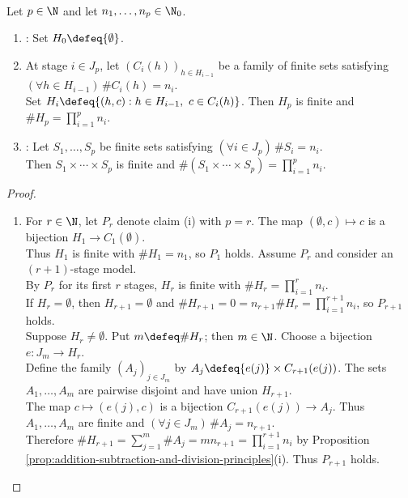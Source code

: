 \begin{theorem} \label{thm:multiplication-principle-finite-products} \\
Let $p\in\N$ and let $n_1,\ldots,n_p\in\N_0$.
\begin{enumerate}[label=(\roman*)]
\setlength{\itemsep}{0pt}
\item {}: Set $H_0\defeq\{\emptyset\}$.
\item At stage $i\in J_p$, let $(C_i(h))_{h\in H_{i-1}}$ be a family of finite sets satisfying $(\forall h\in H_{i-1})\,\#C_i(h)=n_i$.\\
Set $H_i\defeq\{(h,c):h\in H_{i-1},\ c\in C_i(h)\}$. Then $H_p$ is finite and $\#H_p=\prod\limits_{i=1}^{p}n_i$.
\item {}: Let $S_1,\ldots,S_p$ be finite sets satisfying $(\forall i\in J_p)\,\#S_i=n_i$.\\
Then $S_1\times\cdots\times S_p$ is finite and $\#(S_1\times\cdots\times S_p)=\prod\limits_{i=1}^{p}n_i$.
\end{enumerate}
\begin{proof}
\begin{enumerate}[label=(\roman*)]
\setlength{\itemsep}{0pt}
\item For $r\in\N$, let $P_r$ denote claim (i) with $p=r$. The map $(\emptyset,c)\mapsto c$ is a bijection $H_1\to C_1(\emptyset)$.\\
Thus $H_1$ is finite with $\#H_1=n_1$, so $P_1$ holds. Assume $P_r$ and consider an $(r+1)$-stage model.\\
By $P_r$ for its first $r$ stages, $H_r$ is finite with $\#H_r=\prod\limits_{i=1}^{r}n_i$.\\
If $H_r=\emptyset$, then $H_{r+1}=\emptyset$ and $\#H_{r+1}=0=n_{r+1}\#H_r=\prod\limits_{i=1}^{r+1}n_i$, so $P_{r+1}$ holds.\\
Suppose $H_r\neq\emptyset$. Put $m\defeq\#H_r$; then $m\in\N$. Choose a bijection $e:J_m\to H_r$.\\
Define the family $(A_j)_{j\in J_m}$ by $A_j\defeq\{e(j)\}\times C_{r+1}(e(j))$. The sets $A_1,\ldots,A_m$ are pairwise disjoint and have union $H_{r+1}$.\\
The map $c\mapsto(e(j),c)$ is a bijection $C_{r+1}(e(j))\to A_j$. Thus $A_1,\ldots,A_m$ are finite and $(\forall j\in J_m)\,\#A_j=n_{r+1}$.\\
Therefore $\#H_{r+1}=\sum\limits_{j=1}^{m}\#A_j=mn_{r+1}=\prod\limits_{i=1}^{r+1}n_i$ by Proposition \ref{prop:addition-subtraction-and-division-principles}(i). Thus $P_{r+1}$ holds.\\

\end{enumerate}
\end{proof}
\end{theorem}
